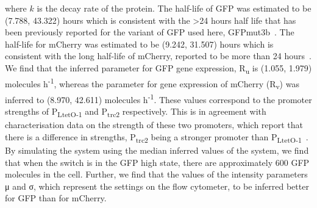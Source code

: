 \noindent where $k$ is the decay rate of the protein. The half-life of GFP was estimated to be (7.788, 43.322) hours which is consistent with the \textgreater 24 hours half life that has been previously reported for the variant of GFP used here, GFPmut3b~\autocite{Andersen:1998tn}. The half-life for mCherry was estimated to be (9.242, 31.507) hours which is consistent with the long half-life of mCherry, reported to be more than 24 hours~\autocite{Shaner:2004vy}. We find that the inferred parameter for GFP gene expression, R\textsubscript{u} is (1.055, 1.979) molecules h\textsuperscript{-1}, whereas the parameter for gene expression of mCherry (R\textsubscript{v}) was inferred to (8.970, 42.611) molecules h\textsuperscript{-1}. These values correspond to the promoter strengths of P\textsubscript{LtetO-1} and P\textsubscript{trc2} respectively. This is in agreement with characterisation data on the strength of these two promoters, which report that there is a difference in strengths, P\textsubscript{trc2} being a stronger promoter than P\textsubscript{LtetO-1}~\autocite{Litcofsky:2012gr}. By simulating the system using the median inferred values of the system, we find that when the switch is in the GFP high state, there are approximately 600 GFP molecules in the cell. Further, we find that the values of the intensity parameters μ and σ, which represent the settings on the flow cytometer, to be inferred better for GFP than for mCherry. 




